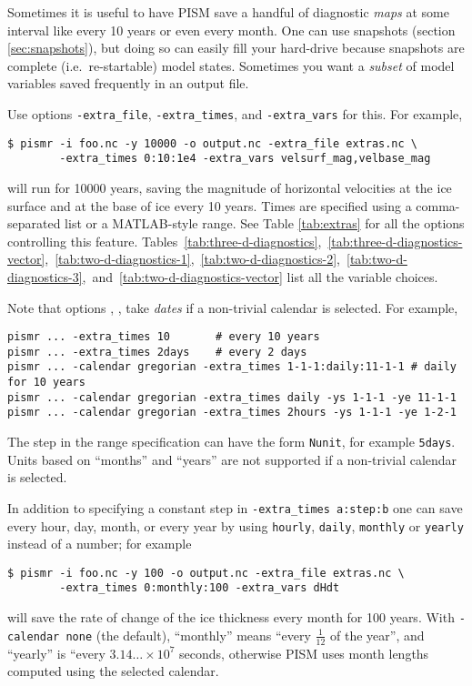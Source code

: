 Sometimes it is useful to have PISM save a handful of diagnostic \emph{maps} at some interval like every 10 years or even every month.  One can use snapshots (section \ref{sec:snapshots}), but doing so can easily fill your hard-drive because snapshots are complete (i.e.~re-startable) model states.  Sometimes you want a \emph{subset} of model variables saved frequently in an output file.

Use options \texttt{-extra_file}, \texttt{-extra_times}, and \texttt{-extra_vars} for this.  For example,
\begin{verbatim}
$ pismr -i foo.nc -y 10000 -o output.nc -extra_file extras.nc \
        -extra_times 0:10:1e4 -extra_vars velsurf_mag,velbase_mag
\end{verbatim}
will run for 10000 years, saving the magnitude of horizontal velocities at the ice surface and at the base of ice every 10 years.  Times are specified using a comma-separated list or a MATLAB-style range.  See Table \ref{tab:extras} for all the options controlling this feature.  Tables~\ref{tab:three-d-diagnostics},~\ref{tab:three-d-diagnostics-vector},~\ref{tab:two-d-diagnostics-1},~\ref{tab:two-d-diagnostics-2},~\ref{tab:two-d-diagnostics-3},~and~\ref{tab:two-d-diagnostics-vector} list all the variable choices.

Note that options ,
,  take \emph{dates}
if a non-trivial calendar is selected. For example,
\begin{verbatim}
pismr ... -extra_times 10       # every 10 years
pismr ... -extra_times 2days    # every 2 days
pismr ... -calendar gregorian -extra_times 1-1-1:daily:11-1-1 # daily for 10 years
pismr ... -calendar gregorian -extra_times daily -ys 1-1-1 -ye 11-1-1
pismr ... -calendar gregorian -extra_times 2hours -ys 1-1-1 -ye 1-2-1
\end{verbatim}

The step in the range specification can have the form \texttt{Nunit},
for example \texttt{5days}. Units based on ``months'' and ``years''
are not supported if a non-trivial calendar is selected.

In addition to specifying a constant step in \texttt{-extra_times a:step:b} one can save every hour, day, month, or every year by using \texttt{hourly}, \texttt{daily}, \texttt{monthly} or \texttt{yearly} instead of a number; for example
\begin{verbatim}
$ pismr -i foo.nc -y 100 -o output.nc -extra_file extras.nc \
        -extra_times 0:monthly:100 -extra_vars dHdt
\end{verbatim}
will save the rate of change of the ice thickness every month for 100
years. With \texttt{-calendar none} (the default), ``monthly'' means
``every $\frac 1 {12}$ of the year'', and ``yearly'' is ``every
$3.14\dots\times10^7$ seconds, otherwise PISM uses month lengths
computed using the selected calendar.

